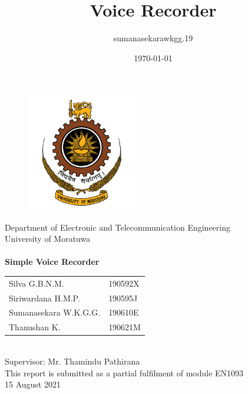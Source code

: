 \documentclass[11pt]{article}
\title{Voice Recorder}
\author{sumanasekarawkgg.19 }
\date{\today}
\begin{document}
\thispagestyle{empty}
\begin{center}
   
   \begin{figure}
   \vspace*{1.5cm}
       \centering
       \includegraphics[width=4.8cm]{Images/uom.png}
   \end{figure}
   
   Department of Electronic and Telecommunication Engineering \\ University of Moratuwa \\
   \vspace{2cm}
   {\fontsize{14}{17}\selectfont\textbf{\\Simple Voice Recorder\\}}
    \vspace{6cm}
   \begin{tabularx}{0.5\textwidth}{ 
  >{\raggedright}X 
  >{\raggedright}}
     Silva G.B.N.M. & 190592X \\ 
     Siriwardana H.M.P. & 190595J \\  
     Sumanasekara W.K.G.G. & 190610E \\
     Thanushan K. & 190621M 
   \end{tabularx}
   \vspace{1cm}
   \\Supervisor: Mr. Thamindu Pathirana 
   \vspace{2cm}
   \\This report is submitted as a partial fulfilment of module EN1093
   \vspace{0.5cm}
   \\15 August 2021
\end{center}
\newpage
\thispagestyle{empty}
\tableofcontents
\newpage
\twocolumn
\clearpage
{} 
\end{document}
